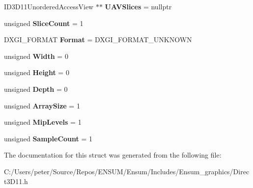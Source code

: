 \begin{DoxyCompactItemize}
\item 
I\+D3\+D11\+Unordered\+Access\+View $\ast$$\ast$ {\bfseries U\+A\+V\+Slices} = nullptr\hypertarget{struct_ensum_1_1_graphics_1_1_render_target_a09270a16a75d83656f7d93471b4ba955}{}\label{struct_ensum_1_1_graphics_1_1_render_target_a09270a16a75d83656f7d93471b4ba955}

\item 
unsigned {\bfseries Slice\+Count} = 1\hypertarget{struct_ensum_1_1_graphics_1_1_render_target_a1d4948952eb3ce8fd016974601f56699}{}\label{struct_ensum_1_1_graphics_1_1_render_target_a1d4948952eb3ce8fd016974601f56699}

\item 
D\+X\+G\+I\+\_\+\+F\+O\+R\+M\+AT {\bfseries Format} = D\+X\+G\+I\+\_\+\+F\+O\+R\+M\+A\+T\+\_\+\+U\+N\+K\+N\+O\+WN\hypertarget{struct_ensum_1_1_graphics_1_1_render_target_a1c5a451b1de1dee8d32fd8cbfa6eb143}{}\label{struct_ensum_1_1_graphics_1_1_render_target_a1c5a451b1de1dee8d32fd8cbfa6eb143}

\item 
unsigned {\bfseries Width} = 0\hypertarget{struct_ensum_1_1_graphics_1_1_render_target_ae12ebc14fb72f280410150d3d0ce63b1}{}\label{struct_ensum_1_1_graphics_1_1_render_target_ae12ebc14fb72f280410150d3d0ce63b1}

\item 
unsigned {\bfseries Height} = 0\hypertarget{struct_ensum_1_1_graphics_1_1_render_target_a5c4a5e9e8706576a7f16a338f1e55de2}{}\label{struct_ensum_1_1_graphics_1_1_render_target_a5c4a5e9e8706576a7f16a338f1e55de2}

\item 
unsigned {\bfseries Depth} = 0\hypertarget{struct_ensum_1_1_graphics_1_1_render_target_a6a4e846256b48d790217684150e2d295}{}\label{struct_ensum_1_1_graphics_1_1_render_target_a6a4e846256b48d790217684150e2d295}

\item 
unsigned {\bfseries Array\+Size} = 1\hypertarget{struct_ensum_1_1_graphics_1_1_render_target_ae6a4cdc4f51358aeeccaa334d57e845e}{}\label{struct_ensum_1_1_graphics_1_1_render_target_ae6a4cdc4f51358aeeccaa334d57e845e}

\item 
unsigned {\bfseries Mip\+Levels} = 1\hypertarget{struct_ensum_1_1_graphics_1_1_render_target_a7534c928a5020607d2d507817ec238af}{}\label{struct_ensum_1_1_graphics_1_1_render_target_a7534c928a5020607d2d507817ec238af}

\item 
unsigned {\bfseries Sample\+Count} = 1\hypertarget{struct_ensum_1_1_graphics_1_1_render_target_adb2e690013dda2dcff182e9dcbcb286d}{}\label{struct_ensum_1_1_graphics_1_1_render_target_adb2e690013dda2dcff182e9dcbcb286d}

\end{DoxyCompactItemize}


The documentation for this struct was generated from the following file\+:\begin{DoxyCompactItemize}
\item 
C\+:/\+Users/peter/\+Source/\+Repos/\+E\+N\+S\+U\+M/\+Ensum/\+Includes/\+Ensum\+\_\+graphics/Direct3\+D11.\+h\end{DoxyCompactItemize}

